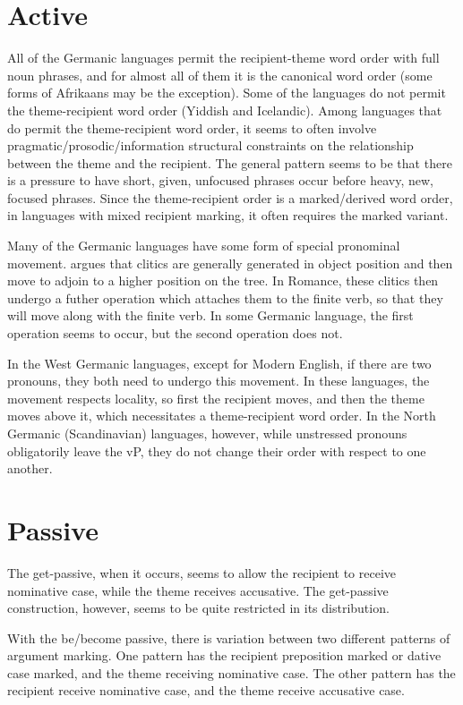 \section{Active}
All of the Germanic languages permit the recipient-theme word order with full noun phrases, and for almost all of them it is the canonical word order (some forms of Afrikaans may be the exception). Some of the languages do not permit the theme-recipient word order (Yiddish and Icelandic). Among languages that do permit the theme-recipient word order, it seems to often involve pragmatic/prosodic/information structural constraints on the relationship between the theme and the recipient. The general pattern seems to be that there is a pressure to have short, given, unfocused phrases occur before heavy, new, focused phrases. Since the theme-recipient order is a marked/derived word order, in languages with mixed recipient marking, it often requires the marked variant.

Many of the Germanic languages have some form of special pronominal movement. \cite{Sportiche.1996} argues that clitics are generally generated in object position and then move to adjoin to a higher position on the tree. In Romance, these clitics then undergo a futher operation which attaches them to the finite verb, so that they will move along with the finite verb. In some Germanic language, the first operation seems to occur, but the second operation does not. 

In the West Germanic languages, except for Modern English, if there are two pronouns, they both need to undergo this movement. In these languages, the movement respects locality, so first the recipient moves, and then the theme moves above it, which necessitates a theme-recipient word order. In the North Germanic (Scandinavian) languages, however, while unstressed pronouns obligatorily leave the vP, they do not change their order with respect to one another.
 
\section{Passive}
The get-passive, when it occurs, seems to allow the recipient to receive nominative case, while the theme receives accusative. The get-passive construction, however, seems to be quite restricted in its distribution. 

With the be/become passive, there is variation between two different patterns of argument marking. One pattern has the recipient preposition marked or dative case marked, and the theme receiving nominative case. The other pattern has the recipient receive nominative case, and the theme receive accusative case.

